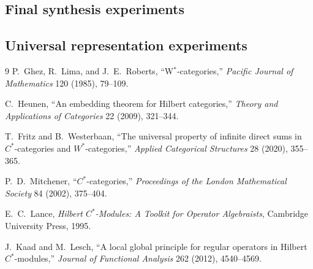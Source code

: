 \documentclass[11pt]{article}
\theoremstyle{definition}
\theoremstyle{remark}
\begin{document}
\clearpage
\subsection{Final synthesis experiments}


\clearpage
\subsection{Universal representation experiments}


\clearpage
\begin{thebibliography}{9}
P.~Ghez, R.~Lima, and J.~E.~Roberts,
``W$^*$-categories,''
\emph{Pacific Journal of Mathematics} 120 (1985), 79--109.

C.~Heunen,
``An embedding theorem for Hilbert categories,''
\emph{Theory and Applications of Categories} 22 (2009), 321--344.

T.~Fritz and B.~Westerbaan,
``The universal property of infinite direct sums in $C^*$-categories and $W^*$-categories,''
\emph{Applied Categorical Structures} 28 (2020), 355--365.

P.~D.~Mitchener,
``$C^*$-categories,''
\emph{Proceedings of the London Mathematical Society} 84 (2002), 375--404.

E.~C.~Lance,
\emph{Hilbert $C^*$-Modules: A Toolkit for Operator Algebraists},
Cambridge University Press, 1995.

J.~Kaad and M.~Lesch,
``A local global principle for regular operators in Hilbert $C^*$-modules,''
\emph{Journal of Functional Analysis} 262 (2012), 4540--4569.
\end{thebibliography}
\end{document}
